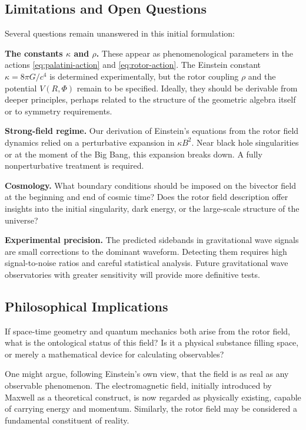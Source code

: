 \documentclass[11pt,a4paper]{article}
\numberwithin{equation}{section}
\theoremstyle{plain}
\theoremstyle{definition}
\theoremstyle{remark}
\begin{document}
\subsection{Limitations and Open Questions}

Several questions remain unanswered in this initial formulation:

\textbf{The constants $\kappa$ and $\rho$.} These appear as phenomenological parameters in the actions \eqref{eq:palatini-action} and \eqref{eq:rotor-action}. The Einstein constant $\kappa = 8\pi G/c^4$ is determined experimentally, but the rotor coupling $\rho$ and the potential $V(R,\Phi)$ remain to be specified. Ideally, they should be derivable from deeper principles, perhaps related to the structure of the geometric algebra itself or to symmetry requirements.

\textbf{Strong-field regime.} Our derivation of Einstein's equations from the rotor field dynamics relied on a perturbative expansion in $\kappa B^2$. Near black hole singularities or at the moment of the Big Bang, this expansion breaks down. A fully nonperturbative treatment is required.

\textbf{Cosmology.} What boundary conditions should be imposed on the bivector field at the beginning and end of cosmic time? Does the rotor field description offer insights into the initial singularity, dark energy, or the large-scale structure of the universe?

\textbf{Experimental precision.} The predicted sidebands in gravitational wave signals are small corrections to the dominant waveform. Detecting them requires high signal-to-noise ratios and careful statistical analysis. Future gravitational wave observatories with greater sensitivity will provide more definitive tests.

\subsection{Philosophical Implications}

If space-time geometry and quantum mechanics both arise from the rotor field, what is the ontological status of this field? Is it a physical substance filling space, or merely a mathematical device for calculating observables?

One might argue, following Einstein's own view, that the field is as real as any observable phenomenon. The electromagnetic field, initially introduced by Maxwell as a theoretical construct, is now regarded as physically existing, capable of carrying energy and momentum. Similarly, the rotor field may be considered a fundamental constituent of reality.
\end{document}
